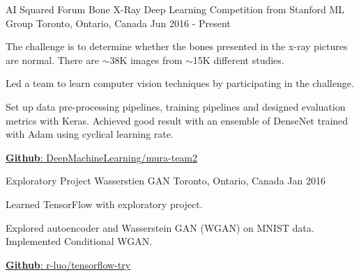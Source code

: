 

\begin{cventries}

  \cventry
    {AI Squared Forum} %
    {Bone X-Ray Deep Learning Competition from Stanford ML Group} %
    {Toronto, Ontario, Canada} %
    {Jun 2016 - Present} %
    {
      \begin{cvitems} %
        \item {The challenge is to determine whether the bones presented in the x-ray pictures are normal. There are $\sim$38K images from $\sim$15K different studies.}
        \item {Led a team to learn computer vision techniques by participating in the challenge.}
        \item {Set up data pre-processing pipelines, training pipelines and designed evaluation metrics with Keras. Achieved good result with an ensemble of DenseNet trained with Adam using cyclical learning rate.}
        \item \href{https://github.com/DeepMachineLearning/mura-team2}{\textbf{Github}: DeepMachineLearning/mura-team2}
      \end{cvitems}
    }

\end{cventries}

\begin{cventries}

  \cventry
    {Exploratory Project} %
    {Wasserstien GAN} %
    {Toronto, Ontario, Canada} %
    {Jan 2016} %
    {
      \begin{cvitems} %
        \item {Learned TensorFlow with exploratory project.}
        \item {Explored autoencoder and Wasserstein GAN (WGAN) on MNIST data. Implemented Conditional WGAN.}
        \item \href{https://github.com/r-luo/tensorflow-try}{\textbf{Github}: r-luo/tensorflow-try}
      \end{cvitems}
    }

\end{cventries}

